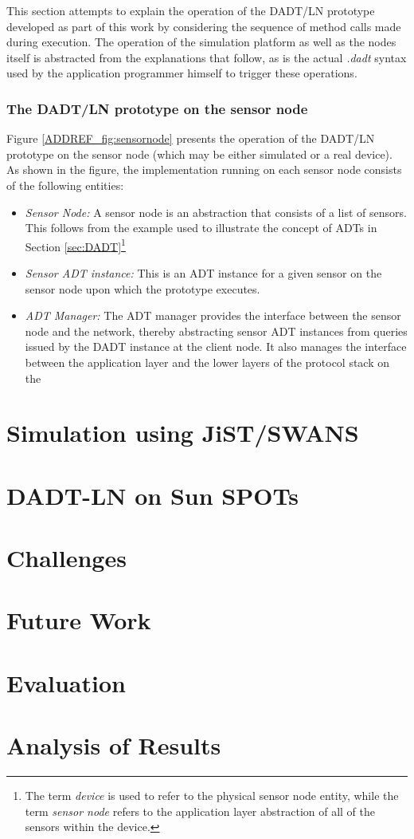 This section attempts to explain the operation of the DADT/LN prototype
developed as part of this work by considering the sequence of method calls made
during execution. The operation of the simulation platform as well as the
nodes itself is abstracted from the explanations that follow, as is the actual
\emph{.dadt} syntax used by the application programmer himself to trigger these
operations. 

\subsubsection{The DADT/LN prototype on the sensor node}

Figure \ref{ADDREF_fig:sensornode} presents the operation of the DADT/LN
prototype on the sensor node (which may be either simulated or a real
device). As shown in the figure, the implementation running on each sensor node 
consists of the following entities:

\begin{itemize}
  \item \emph{Sensor Node:} A sensor node is an abstraction that consists of a
  list of sensors. This follows from the example used to illustrate the concept
  of ADTs in Section \ref{sec:DADT}\footnote{The term \emph{device} is used to
  refer to the physical sensor node entity, while the term \emph{sensor node}
  refers to the application layer abstraction of all of the sensors within the device.}
  \item \emph{Sensor ADT instance:} This is an ADT instance for a given sensor
  on the sensor node upon which the prototype executes. 
  \item \emph{ADT Manager:} The ADT manager provides the interface between the
  sensor node and the network, thereby abstracting sensor ADT instances from
  queries issued by the DADT instance at the client node. It also manages the
  interface between the application layer and the lower layers of the protocol
  stack on the
\end{itemize}




\section{Simulation using JiST/SWANS}

\section{DADT-LN on Sun SPOTs}

\section{Challenges}

\section{Future Work}

\section{Evaluation}

\section{Analysis of Results}

